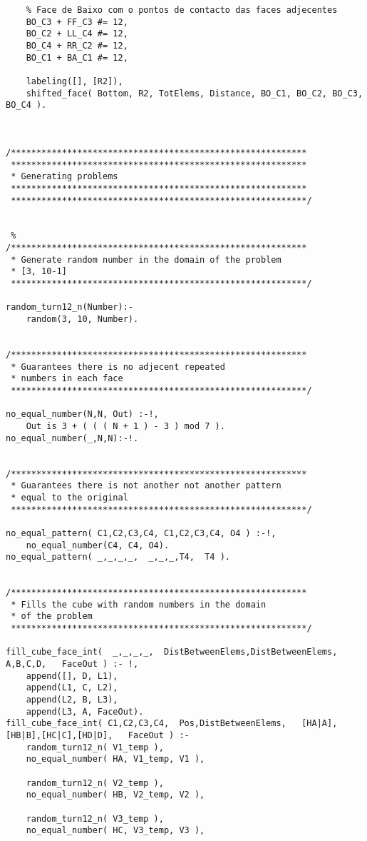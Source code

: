 \begin{lstlisting}
	% Face de Baixo com o pontos de contacto das faces adjecentes
	BO_C3 + FF_C3 #= 12,
	BO_C2 + LL_C4 #= 12,
	BO_C4 + RR_C2 #= 12,
	BO_C1 + BA_C1 #= 12,
	
	labeling([], [R2]),
	shifted_face( Bottom, R2, TotElems, Distance, BO_C1, BO_C2, BO_C3, BO_C4 ).

	
	
/**********************************************************
 **********************************************************
 * Generating problems
 **********************************************************
 **********************************************************/
 
 
 %
/**********************************************************
 * Generate random number in the domain of the problem
 * [3, 10-1]
 **********************************************************/
 
random_turn12_n(Number):-
	random(3, 10, Number).
	
	
/**********************************************************
 * Guarantees there is no adjecent repeated
 * numbers in each face
 **********************************************************/
 
no_equal_number(N,N, Out) :-!,
	Out is 3 + ( ( ( N + 1 ) - 3 ) mod 7 ).
no_equal_number(_,N,N):-!.	


/**********************************************************
 * Guarantees there is not another not another pattern
 * equal to the original
 **********************************************************/
 
no_equal_pattern( C1,C2,C3,C4, C1,C2,C3,C4, O4 ) :-!,
	no_equal_number(C4, C4, O4).
no_equal_pattern( _,_,_,_,  _,_,_,T4,  T4 ).


/**********************************************************
 * Fills the cube with random numbers in the domain
 * of the problem
 **********************************************************/

fill_cube_face_int(  _,_,_,_,  DistBetweenElems,DistBetweenElems,   A,B,C,D,   FaceOut ) :- !,
	append([], D, L1),
	append(L1, C, L2),
	append(L2, B, L3),
	append(L3, A, FaceOut).
fill_cube_face_int( C1,C2,C3,C4,  Pos,DistBetweenElems,   [HA|A],[HB|B],[HC|C],[HD|D],   FaceOut ) :-
	random_turn12_n( V1_temp ),
	no_equal_number( HA, V1_temp, V1 ),
		
	random_turn12_n( V2_temp ),
	no_equal_number( HB, V2_temp, V2 ),
	
	random_turn12_n( V3_temp ),
	no_equal_number( HC, V3_temp, V3 ),
	

\end{lstlisting}
